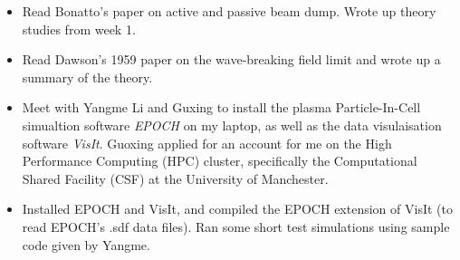 \documentclass[%
onecolumn, notitlepage,
 amsmath,amssymb,
 aps,
]{article}
\begin{document}
\begin{itemize}
\item[\textcolor{MancPurple}{\textbullet}] Read Bonatto's paper on active and passive beam dump. Wrote up theory studies from week 1. 
\item[\textcolor{MancPurple}{\textbullet}]Read Dawson's 1959 paper on the wave-breaking field limit and wrote up a summary of the theory.
\item[\textcolor{MancPurple}{\textbullet}] Meet with Yangme Li and Guxing to install the plasma Particle-In-Cell simualtion software \textit{EPOCH} on my laptop, as well as the data visulaisation software \textit{VisIt}. Guoxing applied for an account for me on the High Performance Computing (HPC) cluster, specifically the Computational Shared Facility (CSF) at the University of Manchester.
\item[\textcolor{MancPurple}{\textbullet}] Installed EPOCH and VisIt, and compiled the EPOCH extension of VisIt (to read EPOCH's .sdf data files). Ran some short test simulations using sample code given by Yangme. 

\end{itemize}
\end{document}

